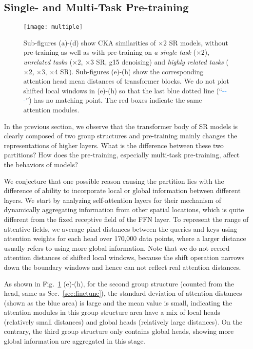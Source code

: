 \documentclass[runningheads]{llncs}
\begin{document}
	\subsection{Single- and Multi-Task Pre-training}
	\label{sec:multi_task}
	
	\begin{figure}[t]
		\begin{center}
			\texttt{[image: multiple]}
		\end{center}
		\vspace{-0.15in}
		\caption{Sub-figures (a)-(d) show CKA similarities of $\times 2$ SR models, without pre-training as well as with pre-training on \textit{a single task} ($\times 2$), \textit{unrelated tasks} ($\times 2$, $\times 3$ SR, g15 denoising) and \textit{highly related tasks} ($\times 2$, $\times 3$, $\times 4$ SR). Sub-figures (e)-(h) show the corresponding attention head mean distances of transformer blocks. We do not plot shifted local windows in (e)-(h) so that the last blue dotted line (``\textcolor{dodgerblue}{-{}-{}-}'') has no matching point. The red boxes indicate the same attention modules.}
		\label{fig:multiple}
		\vspace{-0.1in}
	\end{figure}
	
	In the previous section, we observe that the transformer body of SR models is clearly composed of two group structures and pre-training mainly changes the representations of higher layers. What is the difference between these two partitions? How does the pre-training, especially multi-task pre-training, affect the behaviors of models?


	We conjecture that one possible reason causing the partition lies with the difference of ability to incorporate local or global information between different layers. We start by analyzing self-attention layers for their mechanism of dynamically aggregating information from other spatial locations, which is quite different from the fixed receptive field of the FFN layer. To represent the range of attentive fields, we average pixel distances between the queries and keys using attention weights for each head over 170,000 data points, where a larger distance usually refers to using more global information. Note that we do not record attention distances of shifted local windows, because the shift operation narrows down the boundary windows and hence can not reflect real attention distances.
	
	As shown in Fig.~\ref{fig:multiple} (e)-(h), for the second group structure (counted from the head, same as Sec.~\ref{sec:finetune}), the standard deviation of attention distances (shown as the blue area) is large and the mean value is small, indicating the attention modules in this group structure area have a mix of local heads (relatively small distances) and global heads (relatively large distances). On the contrary, the third group structure only contains global heads, showing more global information are aggregated in this stage.
	
\end{document}
